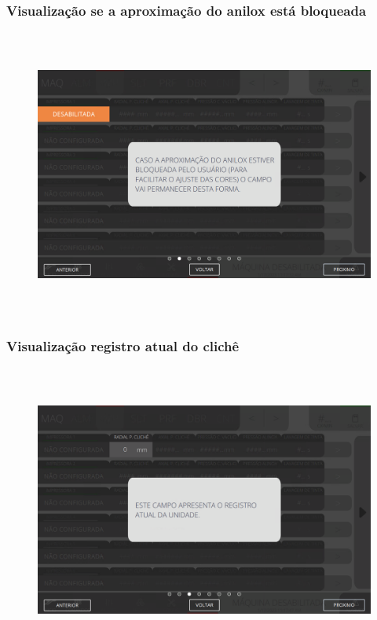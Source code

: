 \newpage
\thispagestyle{fancy}
\vspace*{40 pt}
\subsubsection{\small{Visualização se a aproximação do anilox está bloqueada}}\label{telaAjustesImpressorasVisualizacaoSeAproximacaoDoAniloxEstaBloqueada}
\vspace*{\fill}
\begin{figure}[h]
  \centering
  \includegraphics[width=576px,height=360px]{src/imagesFlexo/04-printter/01-printters/settings/e-2.png}
\end{figure}
\vspace*{\fill}

\newpage
\thispagestyle{fancy}
\vspace*{40 pt}
\subsubsection{\small{Visualização registro atual do clichê}}\label{telaAjustesImpressorasVisualizacaoRegistroAtualDoCliche}
\vspace*{\fill}
\begin{figure}[h]
  \centering
  \includegraphics[width=576px,height=360px]{src/imagesFlexo/04-printter/01-printters/settings/e-3.png}
\end{figure}
\vspace*{\fill}


